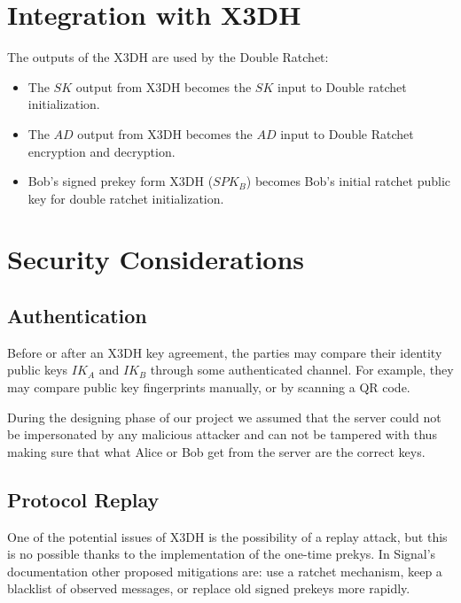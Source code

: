 \section{Integration with X3DH}
\label{sec:IntegrationWithX3DH}

The outputs of the X3DH are used by the Double Ratchet:
\begin{itemize}
  \item The $SK$ output from X3DH becomes the $SK$ input to Double ratchet initialization.
  \item The $AD$ output from X3DH becomes the $AD$ input to Double Ratchet encryption and decryption.
  \item Bob's signed prekey form X3DH ($SPK_B$) becomes Bob's initial ratchet public key for double ratchet initialization.
\end{itemize}

\section{Security Considerations}
\label{sec:SecurityConsideration}

\subsection{Authentication}
\label{subsec:Authentication}

Before or after an X3DH key agreement, the parties may compare their identity public keys $IK_A$ and $IK_B$ through some authenticated channel. For example, they may compare public key fingerprints manually, or by scanning a QR code.

During the designing phase of our project we assumed that the server could not be impersonated by any malicious attacker and can not be tampered with thus making sure that what Alice or Bob get from the server are the correct keys.

\subsection{Protocol Replay}
\label{subsec:ProtocolReplay}

One of the potential issues of X3DH is the possibility of a replay attack, but this is no possible thanks to the implementation of the one-time prekys. In Signal's documentation other proposed mitigations are: use a ratchet mechanism, keep a blacklist of observed messages, or replace old signed prekeys more rapidly.

